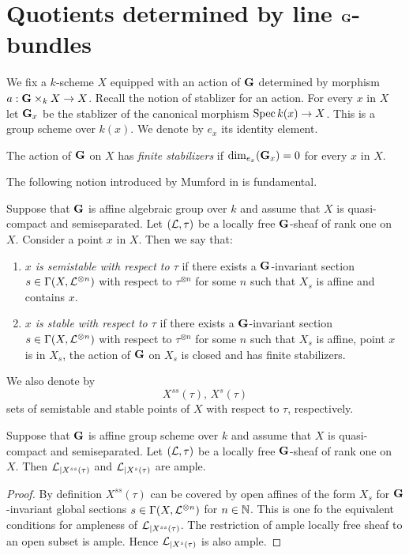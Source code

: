 \section{Quotients determined by line $\mathbf{G}$-bundles}
\noindent
We fix a $k$-scheme $X$ equipped with an action of $\mathbf{G}$ determined by morphism $a:\mathbf{G}\times_kX\rightarrow X$. Recall {\cite[Definition 5.2]{Algebraic_groups}} the notion of stablizer for an action. For every $x$ in $X$ let $\mathbf{G}_x$ be the stablizer of the canonical morphism $\mathrm{Spec}\, k(x)\rightarrow X$. This is a group scheme over $k(x)$. We denote by $e_x$ its identity element. 

\begin{definition}
The action of $\mathbf{G}$ on $X$ has \textit{finite stabilizers} if $\mathrm{dim}_{e_x}(\mathbf{G}_x) = 0$ for every $x$ in $X$.    
\end{definition}
\noindent
The following notion introduced by Mumford in \cite{mumford1994geometric} is fundamental.

\begin{definition}
Suppose that $\mathbf{G}$ is affine algebraic group over $k$ and assume that $X$ is quasi-compact and semiseparated. Let $({\mathcal L},\tau)$ be a locally free $\mathbf{G}$-sheaf of rank one on $X$. Consider a point $x$ in $X$. Then we say that:
\begin{enumerate}[label=\textbf{(\arabic*)}, leftmargin=3.0em]
\item \textit{$x$ is semistable with respect to $\tau$} if there exists a $\mathbf{G}$-invariant section $s\in \Gamma(X,{\mathcal L}^{\otimes n})$ with respect to $\tau^{\otimes n}$ for some $n$ such that $X_s$ is affine and contains $x$.
\item \textit{$x$ is stable with respect to $\tau$} if there exists a $\mathbf{G}$-invariant section $s\in \Gamma(X,{\mathcal L}^{\otimes n})$ with respect to $\tau^{\otimes n}$ for some $n$ such that $X_s$ is affine, point $x$ is in $X_s$, the action of $\mathbf{G}$ on $X_s$ is closed and has finite stabilizers.
\end{enumerate}
We also denote by
$$X^{ss}\left(\tau\right),\,X^s\left(\tau\right)$$
sets of semistable and stable points of $X$ with respect to $\tau$, respectively.
\end{definition}

\begin{fact}\label{fact:line_bundle_is_ample_on_sets_of_semistable_and_stable_points}
Suppose that $\mathbf{G}$ is affine group scheme over $k$ and assume that $X$ is quasi-compact and semiseparated. Let $({\mathcal L},\tau)$ be a locally free $\mathbf{G}$-sheaf of rank one on $X$. Then ${\mathcal L}_{\mid X^{ss}(\tau)}$ and ${\mathcal L}_{\mid X^s(\tau)}$ are ample.
\end{fact}
\begin{proof}
By definition $X^{ss}(\tau)$ can be covered by open affines of the form $X_s$ for $\mathbf{G}$-invariant global sections $s\in \Gamma(X, {\mathcal L}^{\otimes n})$ for $n\in {\mathbb N}$. This is one fo the equivalent conditions for ampleness of ${\mathcal L}_{\mid X^{ss}(\tau)}$. The restriction of ample locally free sheaf to an open subset is ample. Hence ${\mathcal L}_{\mid X^s(\tau)}$ is also ample.    
\end{proof}

